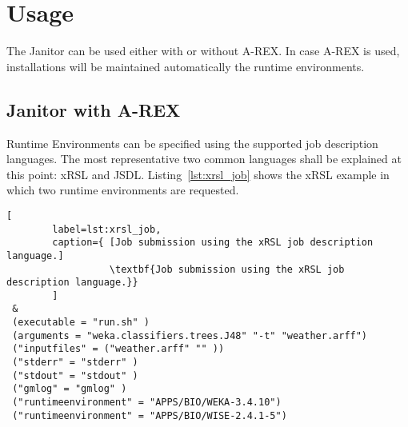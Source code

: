 \chapter{Usage}

The Janitor can be used either with or without A-REX. In case A-REX is used, installations will be maintained automatically the runtime environments.

\section{Janitor with A-REX}

Runtime Environments can be specified using the supported job description languages.
The most representative two common languages shall be explained at this point: xRSL and JSDL.
Listing~\ref{lst:xrsl_job} shows the xRSL example in which two runtime environments are requested.

\begin{lstlisting}[
        label=lst:xrsl_job,
        caption={ [Job submission using the xRSL job description language.]
                  \textbf{Job submission using the xRSL job description language.}}
        ]
 &
 (executable = "run.sh" )
 (arguments = "weka.classifiers.trees.J48" "-t" "weather.arff")
 ("inputfiles" = ("weather.arff" "" ))
 ("stderr" = "stderr" )
 ("stdout" = "stdout" )
 ("gmlog" = "gmlog" )
 ("runtimeenvironment" = "APPS/BIO/WEKA-3.4.10")
 ("runtimeenvironment" = "APPS/BIO/WISE-2.4.1-5")
\end{lstlisting}


